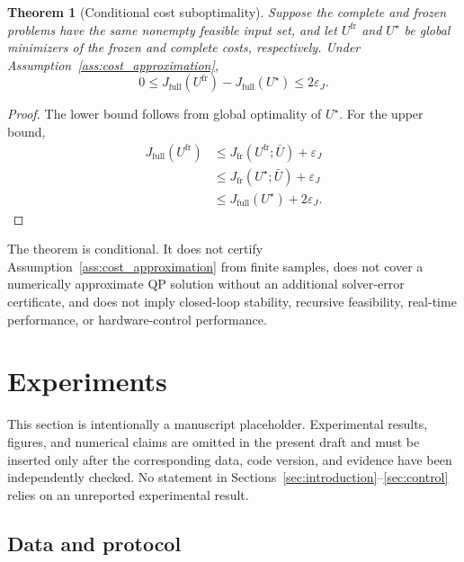 ﻿\documentclass[journal]{IEEEtran}
\newtheorem{theorem}{Theorem}
\begin{document}
\begin{theorem}[Conditional cost suboptimality]
\label{thm:suboptimality}
Suppose the complete and frozen problems have the same nonempty feasible input set, and let $U^{\mathrm{fr}}$ and $U^\star$ be global minimizers of the frozen and complete costs, respectively. Under Assumption~\ref{ass:cost_approximation},
\begin{equation}
    0\le J_{\mathrm{full}}(U^{\mathrm{fr}})-J_{\mathrm{full}}(U^\star)
    \le2\varepsilon_J.
    \label{eq:suboptimality_bound}
\end{equation}
\end{theorem}
\begin{proof}
The lower bound follows from global optimality of $U^\star$. For the upper bound,
\begin{align*}
J_{\mathrm{full}}(U^{\mathrm{fr}})
&\le J_{\mathrm{fr}}(U^{\mathrm{fr}};\bar U)+\varepsilon_J\\
&\le J_{\mathrm{fr}}(U^\star;\bar U)+\varepsilon_J\\
&\le J_{\mathrm{full}}(U^\star)+2\varepsilon_J.
\end{align*}
\end{proof}

The theorem is conditional. It does not certify Assumption~\ref{ass:cost_approximation} from finite samples, does not cover a numerically approximate QP solution without an additional solver-error certificate, and does not imply closed-loop stability, recursive feasibility, real-time performance, or hardware-control performance.

\section{Experiments}
\label{sec:experiments}

This section is intentionally a manuscript placeholder. Experimental results, figures, and numerical claims are omitted in the present draft and must be inserted only after the corresponding data, code version, and evidence have been independently checked. No statement in Sections~\ref{sec:introduction}--\ref{sec:control} relies on an unreported experimental result.

\subsection{Data and protocol}
\end{document}
